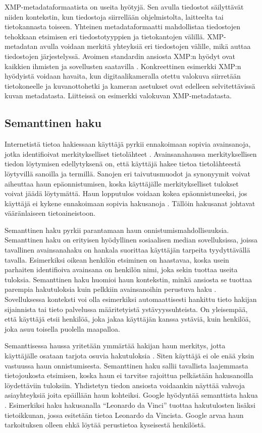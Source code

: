 \documentclass[finnish, 12pt, a4paper, elec, utf8, pdfa, online]{aaltothesis}
\begin{document}
{XMP-metadataformaatista on useita hyötyjä. Sen avulla tiedostot säilyttävät niiden kontekstin, kun tiedostoja siirrellään ohjelmistolta, laitteelta tai tietokannasta toiseen. Yhteinen metadataformaatti mahdollistaa tiedostojen tehokkaan etsimisen eri tiedostotyyppien ja tietokantojen välillä. XMP-metadatan avulla voidaan merkitä yhteyksiä eri tiedostojen välille, mikä auttaa tiedostojen järjestelyssä. Avoimen standardin ansiosta XMP:n hyödyt ovat kaikkien ihmisten ja sovellusten saatavilla \cite{XMP_overall}. Konkreettinen esimerkki XMP:n hyödyistä voidaan havaita, kun digitaalikameralla otettu valokuva siirretään tietokoneelle ja kuvanottohetki ja kameran asetukset ovat edelleen selvitettävissä kuvan metadatasta. Liitteissä on esimerkki valokuvan XMP-metadatasta.

\subsection{Semanttinen haku}

Internetistä tietoa hakiessaan käyttäjä pyrkii ennakoimaan sopivia avainsanoja, jotka identifioivat merkitykselliset tietolähteet \cite{keyword_search}. Avainsanahaussa merkityksellisen tiedon löytymisen edellytyksenä on, että käyttäjä hakee tietoa tietolähteestä löytyvillä sanoilla ja termillä. Sanojen eri taivutusmuodot ja synonyymit voivat aiheuttaa haun epäonnistumisen, koska käyttäjälle merkitykselliset tulokset voivat jäädä löytymättä. Haun lopputulos voidaan kokea epäonnistuneeksi, jos käyttäjä ei kykene ennakoimaan sopivia hakusanoja \cite{keyword_search}. Tällöin hakusanat johtavat vääränlaiseen tietoaineistoon.

Semanttinen haku pyrkii parantamaan haun onnistumismahdollisuuksia. Semanttinen haku on erityisen hyödyllinen sosiaalisen median sovelluksissa, joissa tavallinen avainsanahaku on hankala suorittaa käyttäjän tarpeita tyydyttävällä tavalla. Esimerkiksi oikean henkilön etsiminen on haastavaa, koska usein parhaiten identifioiva avainsana on henkilön nimi, joka sekin tuottaa useita tuloksia. Semanttinen haku huomioi haun kontekstin, minkä ansiosta se tuottaa parempia hakutuloksia kuin pelkkiin avainsanoihin perustuva haku \cite{profium_search}. Sovelluksessa konteksti voi olla esimerkiksi automaattisesti hankittu tieto hakijan sijainnista tai tieto palvelussa määritetyistä ystävyyssuhteista. On yleisempää, että käyttäjä etsii henkilöä, joka jakaa käyttäjän kanssa ystäviä, kuin henkilöä, joka asuu toisella puolella maapalloa.

Semanttisessa haussa yritetään ymmärtää hakijan haun merkitys, jotta käyttäjälle osataan tarjota osuvia hakutuloksia \cite{profium_search}. Siten käyttäjä ei ole enää yksin vastuussa haun onnistumisesta. Semanttinen haku sallii tavallista laajemmasta tietojoukosta etsimisen, koska haun ei tarvitse rajoittua pelkästään hakusanoilla löydettäviin tuloksiin. Yhdistetyn tiedon ansiosta voidaankin näyttää vahvoja asiayhteyksiä joita epäillään haun kohteiksi. Google hyödyntää semanttista hakua \cite{knowledge_graph} \cite{linked_data_finlad}. Esimerkiksi haku hakusanalla ``Leonardo da Vinci'' tuottaa hakutulosten lisäksi tietoikkunan, jossa esitetään tietoa Leonardo da Vincista. Google arvaa haun tarkoituksen olleen ehkä löytää perustietoa kyseisestä henkilöstä.

}
\end{document}
